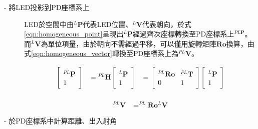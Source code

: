     \begin{description}

        

        \item[- 將LED投影到PD座標系上]\hfill 
        
        \qquad
        LED於空間中由$^L \boldsymbol{P}$代表LED位置、$^L \boldsymbol{V}$代表朝向，於式\ref{eqn:homogeneous_point}呈現出$^L \boldsymbol{P}$經過齊次座標轉換至PD座標系上$^{PL \boldsymbol{P}}$。而$^L \boldsymbol{V}$為單位項量，由於朝向不需經過平移，可以僅用旋轉矩陣$\boldsymbol{Ro}$換算，由式\ref{eqn:homogeneous_vector}轉換至PD座標系上為$^{PL}\boldsymbol{V}$。

        \begin{equation}
            \label{eqn:homogeneous_point}
            \begin{aligned}
            \left[\begin{array}{cc}
            { }^{P L} \boldsymbol{P} \\
            1
            \end{array}\right]&={ }^{P L} \boldsymbol{H}\left[\begin{array}{c}
            { }^{L} \boldsymbol{P} \\
            1
            \end{array}\right] &=\left[\begin{array}{cc}
            { }^{P L} \boldsymbol{R} \boldsymbol{o} & { }^{P L} \boldsymbol{T} \\
            0 & 1
            \end{array}\right]\left[\begin{array}{c}
            { }^{L} \boldsymbol{P} \\
            1
            \end{array}\right] \\
        \end{aligned}
        \end{equation}
        
        \begin{equation}
            \label{eqn:homogeneous_vector}
            \begin{aligned}
            ^{P L} \boldsymbol{V} &=^{P L} \boldsymbol{R} \boldsymbol{o} ^{L}\boldsymbol{ V} 
            \end{aligned}
        \end{equation}




        \item[- 於PD座標系中計算距離、出入射角]\hfill 
        

\end{description}
